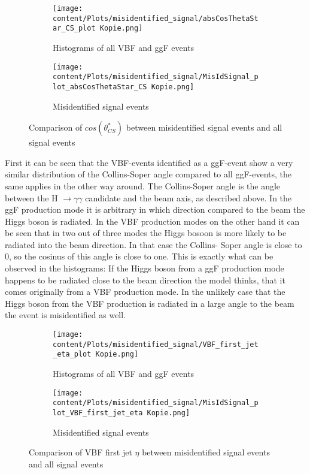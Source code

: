 \begin{figure}[H]
    \centering
    \begin{subfigure}{0.45\textwidth}
        \centering
        \texttt{[image: content/Plots/misidentified\_signal/absCosThetaStar\_CS\_plot Kopie.png]}
        \caption{Histograms of all VBF and ggF events}
        \label{fig:roc1}
    \end{subfigure}
    \hfill
    \begin{subfigure}{0.45\textwidth}
        \centering
        \texttt{[image: content/Plots/misidentified\_signal/MisIdSignal\_plot\_absCosThetaStar\_CS Kopie.png]}
        \caption{Misidentified signal events}
        \label{fig:roc2}
    \end{subfigure}
    \caption{Comparison of $cos(\theta_{CS}^*)$ between misidentified signal events and all signal events}
    \label{fig:combined_roc}
\end{figure}

First it can be seen that the VBF-events identified as a ggF-event show a very similar distribution of the Collins-Soper angle compared to all ggF-events, the same applies in the other way around.
The Collins-Soper angle is the angle between the H $\rightarrow \gamma \gamma$ candidate and the beam axis, as described above. In the ggF production mode it is arbitrary in which direction compared to the beam 
the Higgs boson is radiated. In the VBF production modes on the other hand it can be seen that in two out of three modes the Higgs bosoon is more likely to be radiated into the beam direction. In that case the Collins-
Soper angle is close to $0$, so the cosinus of this angle is close to one. This is exactly what can be observed in the histograms: If the Higgs boson from a ggF production mode happens to be radiated
close to the beam direction the model thinks, that it comes originally from a VBF production mode. In the unlikely case that the Higgs boson from the VBF production is radiated in a large angle to the beam the event is misidentified as well.

\begin{figure}[H]
    \centering
    \begin{subfigure}{0.45\textwidth}
        \centering
        \texttt{[image: content/Plots/misidentified\_signal/VBF\_first\_jet\_eta\_plot Kopie.png]}
        \caption{Histograms of all VBF and ggF events}
        \label{fig:roc1}
    \end{subfigure}
    \hfill
    \begin{subfigure}{0.45\textwidth}
        \centering
        \texttt{[image: content/Plots/misidentified\_signal/MisIdSignal\_plot\_VBF\_first\_jet\_eta Kopie.png]}
        \caption{Misidentified signal events}
        \label{fig:roc2}
    \end{subfigure}
    \caption{Comparison of VBF first jet $\eta$ between misidentified signal events and all signal events}
    \label{fig:combined_roc}
\end{figure}

